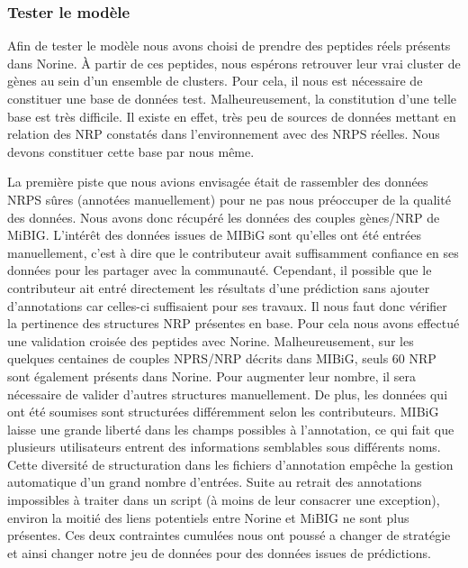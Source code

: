 \subsubsection{Tester le modèle}

Afin de tester le modèle nous avons choisi de prendre des peptides réels présents dans Norine.
À partir de ces peptides, nous espérons retrouver leur vrai cluster de gènes au sein d'un ensemble de clusters.
Pour cela, il nous est nécessaire de constituer une base de données test.
Malheureusement, la constitution d'une telle base est très difficile.
Il existe en effet, très peu de sources de données mettant en relation des NRP constatés dans l'environnement avec des NRPS réelles.
Nous devons constituer cette base par nous même.

La première piste que nous avions envisagée était de rassembler des données NRPS sûres (annotées manuellement) pour ne pas nous préoccuper de la qualité des données.
Nous avons donc récupéré les données des couples gènes/NRP de MiBIG.
L'intérêt des données issues de MIBiG sont qu'elles ont été entrées manuellement, c'est à dire que le contributeur avait suffisamment confiance en ses données pour les partager avec la communauté.
Cependant, il possible que le contributeur ait entré directement les résultats d'une prédiction sans ajouter d'annotations car celles-ci suffisaient pour ses travaux.
Il nous faut donc vérifier la pertinence des structures NRP présentes en base.
Pour cela nous avons effectué une validation croisée des peptides avec Norine.
Malheureusement, sur les quelques centaines de couples NPRS/NRP décrits dans MIBiG, seuls 60 NRP sont également présents dans Norine.
Pour augmenter leur nombre, il sera nécessaire de valider d'autres structures manuellement.
De plus, les données qui ont été soumises sont structurées différemment selon les contributeurs.
MIBiG laisse une grande liberté dans les champs possibles à l'annotation, ce qui fait que plusieurs utilisateurs entrent des informations semblables sous différents noms.
Cette diversité de structuration dans les fichiers d'annotation empêche la gestion automatique d'un grand nombre d'entrées.
Suite au retrait des annotations impossibles à traiter dans un script (à moins de leur consacrer une exception), environ la moitié des liens potentiels entre Norine et MiBIG ne sont plus présentes.
Ces deux contraintes cumulées nous ont poussé a changer de stratégie et ainsi changer notre jeu de données pour des données issues de prédictions.

